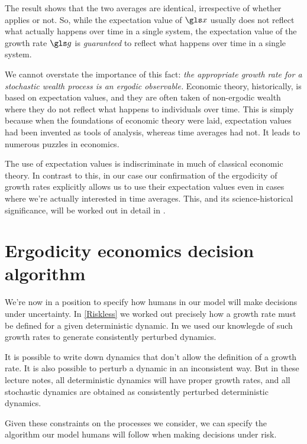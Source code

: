 The result shows that the two averages are identical, irrespective of whether  applies or not. 
So, while the expectation value of $\x$ usually does not reflect what actually happens over time in a single 
system, the expectation value of the growth rate $\g$ is {\it guaranteed} to reflect what happens over time in a single system.


We cannot overstate the importance of this fact: {\it the appropriate growth rate for a stochastic wealth process is an 
ergodic observable.} Economic theory, historically, is based on expectation values, and they are often taken of non-ergodic wealth where they do not reflect what happens to individuals over time. This is simply because when the 
foundations of economic theory were laid, expectation values had been invented as tools of analysis, whereas time 
averages had not. It leads to numerous puzzles in economics. 

The use of expectation values is indiscriminate in much of classical economic theory. In contrast to this, in our case our confirmation of the ergodicity of growth rates explicitly allows us to use their expectation values even in cases where 
we're actually interested in time averages. This, and its science-historical significance, will be worked out in detail 
in .

\section{Ergodicity economics decision algorithm}
We're now in a position to specify how humans in our model will make decisions under uncertainty. 
In \cref{Riskless} we worked out precisely how a growth rate must be defined for a given deterministic dynamic. 
In  we used our knowlegde of such growth rates to generate consistently perturbed dynamics. 
 
It is possible to write down dynamics that don't allow the definition of a growth rate. It is also possible to perturb 
a dynamic in an inconsistent way. But in these lecture notes, all deterministic dynamics will have 
proper growth rates, and all stochastic dynamics are obtained as consistently perturbed deterministic 
dynamics.

Given these constraints on the processes we consider, we can specify the algorithm our model humans will 
follow when making decisions under risk.

